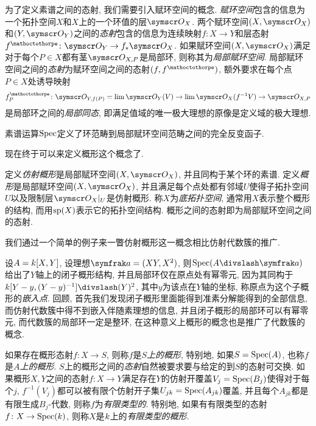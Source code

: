 为了定义素谱之间的态射, 我们需要引入赋环空间的概念. \emph{赋环空间}包含的信息为一个拓扑空间$X$和$X$上的一个环值的层$\OO_X$. 两个赋环空间$(X, \OO_X)$和$(Y, \OO_Y)$之间的\emph{态射}包含的信息为连续映射$f\colon X\to Y$和层态射$f^\mathoctothorpe\colon \OO_Y\to f_*\OO_X$. 如果赋环空间$(X, \OO_X)$满足对于每个$P\in X$都有茎$\OO_{X, P}$是局部环, 则称其为\emph{局部赋环空间}. 局部赋环空间之间的\emph{态射}为赋环空间之间的态射$(f, f^\mathoctothorpe)$, 额外要求在每个点$P\in X$处诱导映射
\begin{equation*}
  f^\mathoctothorpe_P\colon \OO_{Y, f(P)}=\dlim \OO_Y(V)\to \dlim\OO_X (f^{-1}V) \to \OO_{X, P}
\end{equation*}
是局部环之间的\emph{局部同态}, 即满足值域的唯一极大理想的原像是定义域的极大理想.

\begin{propositionnoproof}
  素谱运算$\Spec$定义了环范畴到局部赋环空间范畴之间的完全反变函子.
\end{propositionnoproof}

现在终于可以来定义概形这个概念了.

\begin{definition}
  定义\emph{仿射概形}是局部赋环空间$(X, \OO_X)$, 并且同构于某个环的素谱. 定义\emph{概形}是局部赋环空间$(X, \OO_X)$, 并且满足每个点处都有邻域$U$使得子拓扑空间$U$以及限制层$\OO_X\restrict{U}$是仿射概形. 称$X$为\emph{底拓扑空间}, 通常用$X$表示整个概形的结构, 而用$\sp (X)$表示它的拓扑空间结构. 概形之间的态射即为局部赋环空间之间的态射.
\end{definition}

我们通过一个简单的例子来一瞥仿射概形这一概念相比仿射代数簇的推广.

\begin{example}
  设$A=\kk [X, Y]$, 设理想$\ideal{a}=(XY, X^2)$, 则$\Spec (A{\divslash}\ideal{a})$给出了$Y$轴上的闭子概形结构, 并且局部环仅在原点处有幂零元, 因为其同构于$\kk [Y-y, (Y-y)^{-1}]{\divslash}(Y)^2$, 其中$y$为该点在$Y$轴的坐标, 称原点为这个子概形的\emph{嵌入点}. 回顾, 首先我们发现闭子概形里面能得到准素分解能得到的全部信息, 而仿射代数簇中得不到嵌入伴随素理想的信息, 并且闭子概形的局部环可以有幂零元, 而代数簇的局部环一定是整环, 在这种意义上概形的概念也是推广了代数簇的概念.
\end{example}

如果存在概形态射$f\colon X\to S$, 则称$f$是$S$\emph{上的概形}, 特别地, 如果$S=\Spec (A)$, 也称$f$是$A$\emph{上的概形}. $S$上的概形之间的\emph{态射}自然被要求要与给定的到$S$的态射可交换. 如果概形$X, Y$之间的态射$f\colon X\to Y$满足存在$Y$的仿射开覆盖$V_j=\Spec (B_j)$使得对于每个$j$, $f^{-1}(V_j)$都可以被有限个仿射开子集$U_{jk}=\Spec (A_{jk})$覆盖, 并且每个$A_{jk}$都是有限生成$B_j$-代数, 则称$f$为\emph{有限类型的}. 特别地, 如果有有限类型的态射$f\colon X\to \Spec (\kk)$, 则称$X$是$\kk$上的\emph{有限类型的概形}.

